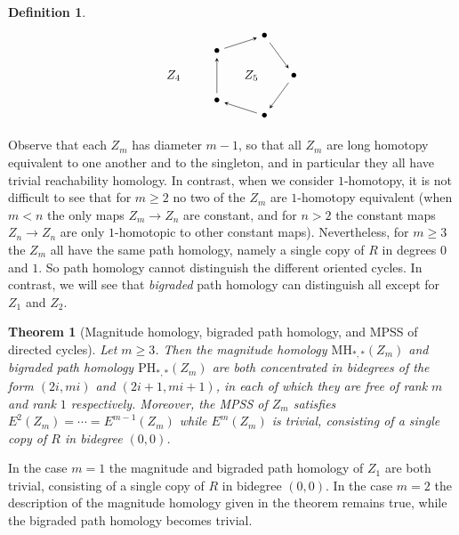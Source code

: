 \documentclass[a4paper, 11 pt, oneside, reqno]{amsart}
\numberwithin{lemma}{section}
\newtheorem{theorem}[lemma]{Theorem}
\theoremstyle{definition}
\newtheorem{definition}[lemma]{Definition}
\newcommand{\MH}{\mathrm{MH}}
\newcommand{\PH}{\mathrm{PH}}
\begin{document}
\begin{definition}
\[\begin{tikzpicture}[baseline=0]
            \node () at (0:0) {$Z_4$};
        \end{tikzpicture}
        \qquad
        \begin{tikzpicture}[baseline=0]
            \node (a) at (0:1.2) {$\bullet$};
            \node (b) at (72:1.2) {$\bullet$};
            \node (c) at (144:1.2) {$\bullet$};
            \node (d) at (216:1.2) {$\bullet$};
            \node (e) at (288:1.2) {$\bullet$};
    
            \draw[stealth-] (a) -- (b);
            \draw[stealth-] (b) -- (c);
            \draw[stealth-] (c) -- (d);
            \draw[stealth-] (d) -- (e);
            \draw[stealth-] (e) -- (a);
    
            \node () at (0:0) {$Z_5$};
        \end{tikzpicture}
        \]
\end{definition}

Observe that each $Z_m$ has diameter $m-1$, so that 
all $Z_m$ are long homotopy equivalent to one another 
and to the singleton, and in particular they all
have trivial reachability homology.
In contrast, when we consider $1$-homotopy, it is not difficult
to see that for \(m \geq 2\) no two of the $Z_m$ are $1$-homotopy equivalent
(when $m<n$ the only maps $Z_m\to Z_n$ are constant, and for $n>2$
the constant maps $Z_n\to Z_n$ are only $1$-homotopic to other 
constant maps).
Nevertheless, for $m\geq 3$ the $Z_m$ all have the same path homology,
namely a single copy of $R$ in degrees $0$ and $1$.
So path homology cannot distinguish 
the different oriented cycles.
In contrast, we will see that \emph{bigraded} path homology 
can distinguish all except for $Z_1$ and $Z_2$.

\begin{theorem}[Magnitude homology, bigraded path homology, and MPSS of directed cycles]
\label{theorem-directed-cycles-omnibus}
    Let $m\geq 3$.
    Then the magnitude homology $\MH_{\ast,\ast}(Z_m)$
    and  bigraded path homology $\PH_{\ast,\ast}(Z_m)$
    are both concentrated in bidegrees of the form 
    $(2i,mi)$ and $(2i+1,mi+1)$, in each of which they are free of rank $m$
    and rank $1$ respectively.
    Moreover, the MPSS of $Z_m$ satisfies  $E^2(Z_m)=\cdots=E^{m-1}(Z_m)$
    while $E^m(Z_m)$ is trivial, consisting of a single copy of $R$ in
    bidegree $(0,0)$.
\end{theorem}

In the case $m=1$ the magnitude and bigraded path homology of $Z_1$ are
both trivial, consisting of a single copy of $R$ in bidegree $(0,0)$.
In the case $m=2$ the description of the magnitude homology
given in the theorem remains true,
while the bigraded path homology becomes trivial.
\end{document}
